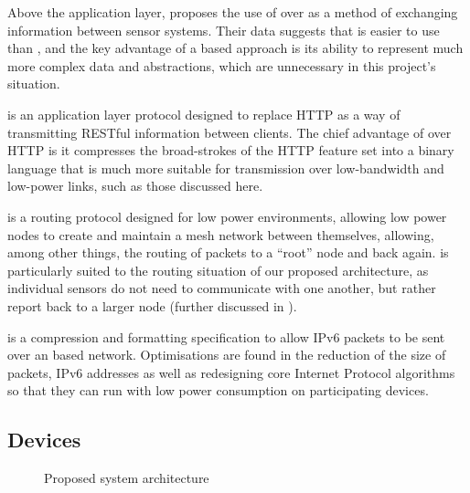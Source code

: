 \documentclass[../thesis/thesis.tex]{subfiles}
\begin{document}
Above the application layer, \cite{guinard2012search} proposes the use of \rest over \ws  as a method of exchanging information between sensor systems. Their data suggests that \rest is easier to use than \ws, and the key advantage of a \ws based approach is its ability to represent much more complex data and abstractions, which are unnecessary in this project's situation.

\coap \cite{kovatsch2013coap} is an application layer protocol designed to replace HTTP as a way of transmitting RESTful information between clients. The chief advantage of \coap over HTTP is it compresses the broad-strokes of the HTTP feature set into a binary language that is much more suitable for transmission over low-bandwidth and low-power links, such as those discussed here.

\roll \cite{rfc6550} is a routing protocol designed for low power environments, allowing low power nodes to create and maintain a mesh network between themselves, allowing, among other things, the routing of packets to a ``root'' node and back again. \roll is particularly suited to the routing situation of our proposed architecture, as individual sensors do not need to communicate with one another, but rather report back to a larger node (further discussed in ).

\lowpan \cite{shelby20116lowpan} is a compression and formatting specification to allow IPv6 packets to be sent over an \lwifi based network. Optimisations are found in the reduction of the size of \lowpan packets, IPv6 addresses as well as redesigning core Internet Protocol algorithms so that they can run with low power consumption on participating devices.


\subsection{Devices}
\label{subsec:litreview:architecture:devices}
\begin{figure}
\centering
{}
\caption{Proposed system architecture}
\label{fig:litreview:devices}
\end{figure}
\end{document}
